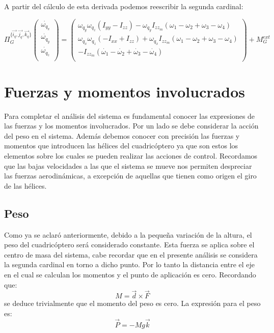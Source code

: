 \documentclass[main]{subfiles}
\begin{document}
A partir del c\'alculo de esta derivada podemos reescribir la segunda cardinal:

\begin{equation}
 \Pi_{G}^{\{\vec{i_q}, \vec{j_q}, \vec{k_q}\}}\left(\begin{array}{c}
\dot{\omega_{q_x}}\\
\dot{\omega_{q_y}}\\
\dot{\omega_{q_z}}\\
\end{array}\right) = \left(\begin{array}{c}
\omega_{q_y}\omega_{q_z}(I_{yy}-I_{zz})-\omega_{q_y}I_{zz_m}(\omega_1-\omega_2+\omega_3-\omega_4)\\

\omega_{q_x}\omega_{q_z}(-I_{xx}+I_{zz})+\omega_{q_x}I_{zz_m}(\omega_1-\omega_2+\omega_3-\omega_4)\\

-I_{zz_m}(\dot{\omega_1}-\dot{\omega_2}+\dot{\omega_3}-\dot{\omega_4})\\

\end{array}\right) + M_G^{ext}
\label{eq:omegas}
\end{equation}


\section{Fuerzas y momentos involucrados}
\label{FYT}

Para completar el an\'alisis del sistema es fundamental conocer las expresiones de las fuerzas y los momentos involucrados. Por un lado se debe considerar la acci\'on del peso en el sistema. Adem\'as debemos conocer con precisi\'on las fuerzas y momentos que introducen las h\'elices del cuadric\'optero ya que son estos los elementos sobre los cuales se pueden realizar las acciones de control. Recordamos que las bajas velocidades a las que el sistema se mueve nos permiten despreciar las fuerzas aerodin\'amicas, a excepci\'on de aquellas que tienen como origen el giro de las h\'elices.
\subsection{Peso}
Como ya se aclar\'o anteriormente, debido a la peque\~na variaci\'on de la altura, el peso del cuadric\'optero ser\'a considerado constante. Esta fuerza se aplica sobre el centro de masa del sistema, cabe recordar que en el presente an\'alisis se considera la segunda cardinal en torno a dicho punto. Por lo tanto la distancia entre el eje en el cual se calculan los momentos y el punto de aplicaci\'on es cero. Recordando que: $$
M=\vec{d}\times\vec{F}
$$
se deduce trivialmente que el momento del peso es cero. La expresi\'on para el peso es:
$$
\vec{P}=-Mg\vec{k}
$$
\end{document}
